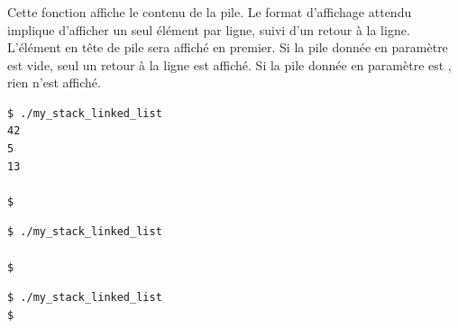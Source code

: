 \subsubsection*{}

\noindent Cette fonction affiche le contenu de la pile.
Le format d'affichage attendu implique d'afficher un seul élément par ligne, suivi d'un retour à la ligne.
L'élément en tête de pile sera affiché en premier.
Si la pile donnée en paramètre est vide, seul un retour à la ligne est affiché.
Si la pile donnée en paramètre est , rien n'est affiché.

\bigskip

\lstset{language=sh}
\begin{lstlisting}[frame=single,title={Exemple d'affichage du cas normal : pile contenant 42, 5, 13}]
$ ./my_stack_linked_list
42
5
13

$
\end{lstlisting}

\bigskip

\lstset{language=sh}
\begin{lstlisting}[frame=single,title={Exemple d'affichage d'une pile vide}]
$ ./my_stack_linked_list

$
\end{lstlisting}

\bigskip

\lstset{language=sh}
\begin{lstlisting}[frame=single,title={Exemple d'affichage d'un pointeur NULL}]
$ ./my_stack_linked_list
$
\end{lstlisting}

